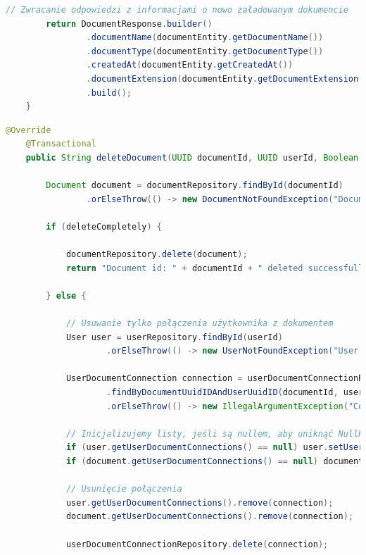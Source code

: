 \begin{lstlisting}[language=Java, caption=Metoda dodawania dokumentu w klasie \texttt{DocumentServiceImp}]
        // Zwracanie odpowiedzi z informacjami o nowo załadowanym dokumencie
        return DocumentResponse.builder()
                .documentName(documentEntity.getDocumentName())
                .documentType(documentEntity.getDocumentType())
                .createdAt(documentEntity.getCreatedAt())
                .documentExtension(documentEntity.getDocumentExtension())
                .build();
    }
\end{lstlisting}

\begin{lstlisting}[language=Java, caption=Metoda usuwania dokumetów i konretnych połaczeń z dokumentami w klasie \texttt{DocumentServiceImp}]
 @Override
    @Transactional
    public String deleteDocument(UUID documentId, UUID userId, Boolean deleteCompletely) throws DocumentNotFoundException, UserNotFoundException, IllegalArgumentException {

        Document document = documentRepository.findById(documentId)
                .orElseThrow(() -> new DocumentNotFoundException("Document id: " + documentId + " not found"));

        if (deleteCompletely) {

            documentRepository.delete(document);
            return "Document id: " + documentId + " deleted successfully for all users";

        } else {

            // Usuwanie tylko połączenia użytkownika z dokumentem
            User user = userRepository.findById(userId)
                    .orElseThrow(() -> new UserNotFoundException("User id: " + userId + " not found"));

            UserDocumentConnection connection = userDocumentConnectionRepository
                    .findByDocumentUuidIDAndUserUuidID(documentId, userId)
                    .orElseThrow(() -> new IllegalArgumentException("Connection not found"));

            // Inicjalizujemy listy, jeśli są nullem, aby uniknąć NullPointerException
            if (user.getUserDocumentConnections() == null) user.setUserDocumentConnections(new ArrayList<>());
            if (document.getUserDocumentConnections() == null) document.setUserDocumentConnections(new ArrayList<>());

            // Usunięcie połączenia
            user.getUserDocumentConnections().remove(connection);
            document.getUserDocumentConnections().remove(connection);

            userDocumentConnectionRepository.delete(connection);


\end{lstlisting}
